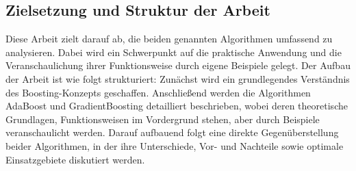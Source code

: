 \subsection{Zielsetzung und Struktur der Arbeit}
Diese Arbeit zielt darauf ab, die beiden genannten Algorithmen umfassend zu analysieren. Dabei wird ein Schwerpunkt auf die praktische Anwendung und die Veranschaulichung ihrer Funktionsweise durch eigene Beispiele gelegt. Der Aufbau der Arbeit ist wie folgt strukturiert: Zunächst wird ein grundlegendes Verständnis des Boosting-Konzepts geschaffen. Anschließend werden die Algorithmen AdaBoost und GradientBoosting detailliert beschrieben, wobei deren theoretische Grundlagen, Funktionsweisen im Vordergrund stehen, aber durch Beispiele veranschaulicht werden. Darauf aufbauend folgt eine direkte Gegenüberstellung beider Algorithmen, in der ihre Unterschiede, Vor- und Nachteile sowie optimale Einsatzgebiete diskutiert werden.



\cite[text]{Frochte2020}
\cite[text]{SchapireFreund2012}
\cite[text]{Geron2018}
\cite[text]{James2023}
\cite[text]{Hastie2009}